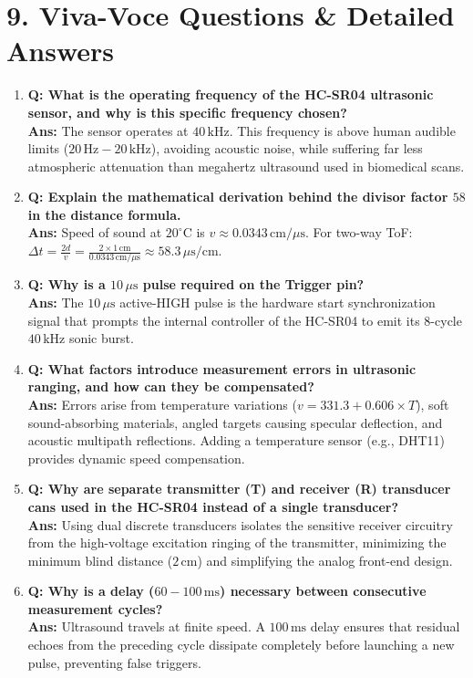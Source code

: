 \documentclass[10pt,a4paper]{article}
\begin{document}
\section*{9. Viva-Voce Questions \& Detailed Answers}
\begin{enumerate}[leftmargin=*]
    \item \textbf{Q: What is the operating frequency of the HC-SR04 ultrasonic sensor, and why is this specific frequency chosen?}\\
    \textbf{Ans:} The sensor operates at $40\,\text{kHz}$. This frequency is above human audible limits ($20\,\text{Hz}-20\,\text{kHz}$), avoiding acoustic noise, while suffering far less atmospheric attenuation than megahertz ultrasound used in biomedical scans.

    \item \textbf{Q: Explain the mathematical derivation behind the divisor factor $58$ in the distance formula.}\\
    \textbf{Ans:} Speed of sound at $20^\circ\text{C}$ is $v \approx 0.0343\,\text{cm}/\mu\text{s}$. For two-way ToF: $\Delta t = \frac{2d}{v} = \frac{2 \times 1\,\text{cm}}{0.0343\,\text{cm}/\mu\text{s}} \approx 58.3\,\mu\text{s}/\text{cm}$.

    \item \textbf{Q: Why is a $10\,\mu\text{s}$ pulse required on the Trigger pin?}\\
    \textbf{Ans:} The $10\,\mu\text{s}$ active-HIGH pulse is the hardware start synchronization signal that prompts the internal controller of the HC-SR04 to emit its 8-cycle $40\,\text{kHz}$ sonic burst.

    \item \textbf{Q: What factors introduce measurement errors in ultrasonic ranging, and how can they be compensated?}\\
    \textbf{Ans:} Errors arise from temperature variations ($v = 331.3 + 0.606 \times T$), soft sound-absorbing materials, angled targets causing specular deflection, and acoustic multipath reflections. Adding a temperature sensor (e.g., DHT11) provides dynamic speed compensation.

    \item \textbf{Q: Why are separate transmitter (T) and receiver (R) transducer cans used in the HC-SR04 instead of a single transducer?}\\
    \textbf{Ans:} Using dual discrete transducers isolates the sensitive receiver circuitry from the high-voltage excitation ringing of the transmitter, minimizing the minimum blind distance ($2\,\text{cm}$) and simplifying the analog front-end design.

    \item \textbf{Q: Why is a delay ($60-100\,\text{ms}$) necessary between consecutive measurement cycles?}\\
    \textbf{Ans:} Ultrasound travels at finite speed. A $100\,\text{ms}$ delay ensures that residual echoes from the preceding cycle dissipate completely before launching a new pulse, preventing false triggers.
\end{enumerate}
\end{document}
